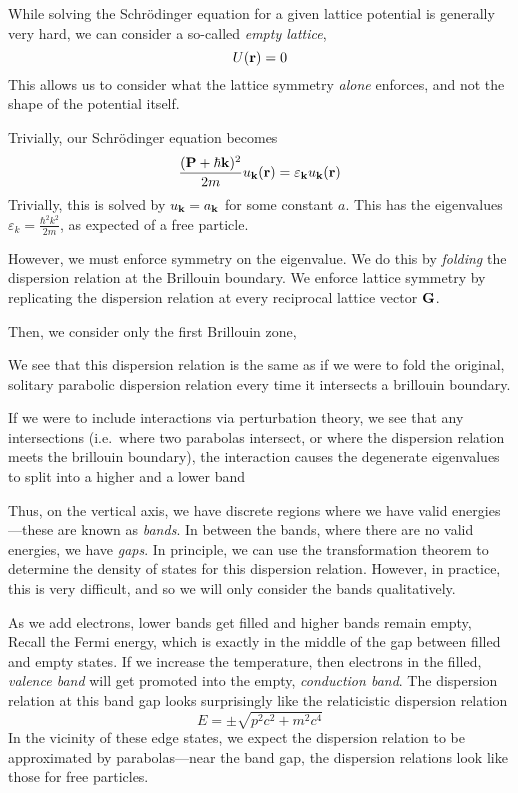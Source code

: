 While solving the Schr\"odinger equation for a given lattice potential is generally very hard, we can consider a so-called \emph{empty lattice},
\[U(\mathbf{r}) = 0\]
This allows us to consider what the lattice symmetry \emph{alone} enforces, and not the shape of the potential itself.

Trivially, our Schr\"odinger equation becomes
\[\frac{(\mathbf{P}+\hbar\mathbf{k})^2}{2m}u_{\mathbf{k}}(\mathbf{r})=\varepsilon_{\mathbf{k}}u_{\mathbf{k}}(\mathbf{r})\]
Trivially, this is solved by \(u_{\mathbf{k}}=a_{\mathbf{k}}\) for some constant \(a\). This has the eigenvalues \(\varepsilon_k =\frac{\hbar^2k^2}{2m}\), as expected of a free particle.

\diagram{}

However, we must enforce symmetry on the eigenvalue. We do this by \emph{folding} the dispersion relation at the Brillouin boundary. We enforce lattice symmetry by replicating the dispersion relation at every reciprocal lattice vector \(\mathbf{G}\).

\diagram{}

Then, we consider only the first Brillouin zone, 

\diagram{}

We see that this dispersion relation is the same as if we were to fold the original, solitary parabolic dispersion relation every time it intersects a brillouin boundary.

If we were to include interactions via perturbation theory, we see that any intersections (i.e.\ where two parabolas intersect, or where the dispersion relation meets the brillouin boundary), the interaction causes the degenerate eigenvalues to split into a higher and a lower band

\diagram{}

Thus, on the vertical axis, we have discrete regions where we have valid energies---these are known as \emph{bands}. In between the bands, where there are no valid energies, we have \emph{gaps}. In principle, we can use the transformation theorem to determine the density of states for this dispersion relation. However, in practice, this is very difficult, and so we will only consider the bands qualitatively.

As we add electrons, lower bands get filled and higher bands remain empty, Recall the Fermi energy, which is exactly in the middle of the gap between filled and empty states. If we increase the temperature, then electrons in the filled, \emph{valence band} will get promoted into the empty, \emph{conduction band}. The dispersion relation at this band gap looks surprisingly like the relaticistic dispersion relation
\[E = \pm\sqrt{p^2c^2+m^2c^4}\]
In the vicinity of these edge states, we expect the dispersion relation to be approximated by parabolas---near the band gap, the dispersion relations look like those for free particles.

